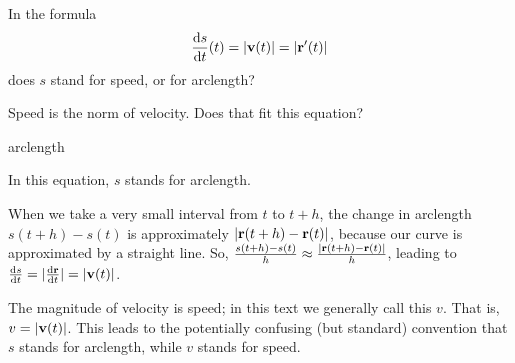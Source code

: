 \begin{question}
	In the formula
	\[\diff{s}{t}(t)=|\vv(t)|=|\vr'(t)|\]
	does $s$ stand for speed, or for arclength?
\end{question}
\begin{hint}
	Speed is the norm of velocity. Does that fit this equation?
\end{hint}
\begin{answer}
	arclength
\end{answer}
\begin{solution}
	In this equation, $s$ stands for arclength. 
	
	When we take a very small interval from $t$ to $t+h$, the change in arclength $s(t+h)-s(t)$ is approximately $|\mathbf{r}(t+h)-\mathbf{r}(t)|$, because our curve is approximated by a straight line. So, $\frac{s(t+h)-s(t)}{h} \approx \frac{|\mathbf{r}(t+h)-\mathbf{r}(t)|}{h}$, leading to $\diff{s}{t}=|\diff{\vr}{t}|=|\vv(t)|$.
	
The magnitude of velocity is speed; in this text we generally call this $v$. That is, $v=|\mathbf{v}(t)|$. This leads to the potentially confusing (but standard) convention that $s$ stands for arclength, while $v$ stands for speed.
\end{solution}

